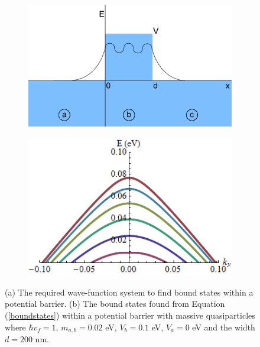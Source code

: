 \documentclass[12pt,a4paper]{report}
\begin{document}
\begin{figure}
	\begin{subfigure}{0.45\textwidth}
		\centerline{\includegraphics[scale=0.4]{images/bound-states}}
		\caption{}
		\label{}
	\end{subfigure}
	\hspace{1.2cm}
	\begin{subfigure}{0.45\textwidth}
		\centerline{\includegraphics[scale=0.7]{images/bound-states-plot}}
		\caption{}
		\label{}
	\end{subfigure}
	\caption{(a) The required wave-function system to find bound states within a potential barrier. (b) The bound states found from Equation (\ref{boundstates}) within a potential barrier with massive quasiparticles where $\hbar v_{f}=1$, $m_{a,b}=0.02$ eV, $V_{b}=0.1$ eV, $V_{a}=0$ eV and the width $d=200$ nm.}
	\label{bound-states}
\end{figure}
\end{document}
